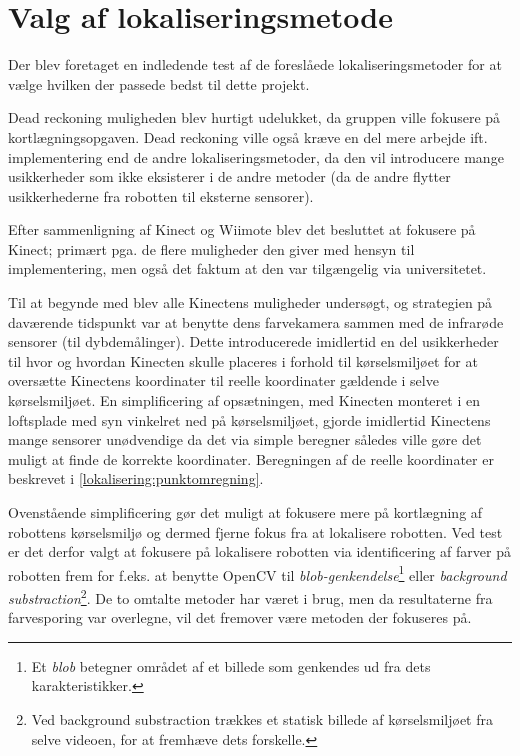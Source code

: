 \section{Valg af lokaliseringsmetode}
Der blev foretaget en indledende test af de foreslåede lokaliseringsmetoder for at vælge hvilken der passede bedst til dette projekt.

Dead reckoning muligheden blev hurtigt udelukket, da gruppen ville fokusere på kortlægningsopgaven.
Dead reckoning ville også kræve en del mere arbejde ift. implementering end de andre lokaliseringsmetoder, da den vil introducere mange usikkerheder som ikke eksisterer i de andre metoder (da de andre flytter usikkerhederne fra robotten til eksterne sensorer).

Efter sammenligning af Kinect og Wiimote blev det besluttet at fokusere på Kinect; primært pga. de flere muligheder den giver med hensyn til implementering, men også det faktum at den var tilgængelig via universitetet.

Til at begynde med blev alle Kinectens muligheder undersøgt, og strategien på daværende tidspunkt var at benytte dens farvekamera sammen med de infrarøde sensorer (til dybdemålinger). 
Dette introducerede imidlertid en del usikkerheder til hvor og hvordan Kinecten skulle placeres i forhold til kørselsmiljøet for at oversætte Kinectens koordinater til reelle koordinater gældende i selve kørselsmiljøet.
En simplificering af opsætningen, med Kinecten monteret i en loftsplade med syn vinkelret ned på kørselsmiljøet, gjorde imidlertid Kinectens mange sensorer unødvendige da det via simple beregner således ville gøre det muligt at finde de korrekte koordinater.
Beregningen af de reelle koordinater er beskrevet i \cref{lokalisering:punktomregning}.

Ovenstående simplificering gør det muligt at fokusere mere på kortlægning af robottens kørselsmiljø og dermed fjerne fokus fra at lokalisere robotten.
Ved test er det derfor valgt at fokusere på lokalisere robotten via identificering af farver på robotten frem for f.eks. at benytte OpenCV til \textit{blob-genkendelse}\footnote{Et \textit{blob} betegner området af et billede som genkendes ud fra dets karakteristikker.} eller \textit{background substraction}\footnote{Ved background substraction trækkes et statisk billede af kørselsmiljøet fra selve videoen, for at fremhæve dets forskelle.}.
De to omtalte metoder har været i brug, men da resultaterne fra farvesporing var overlegne, vil det fremover være metoden der fokuseres på.


